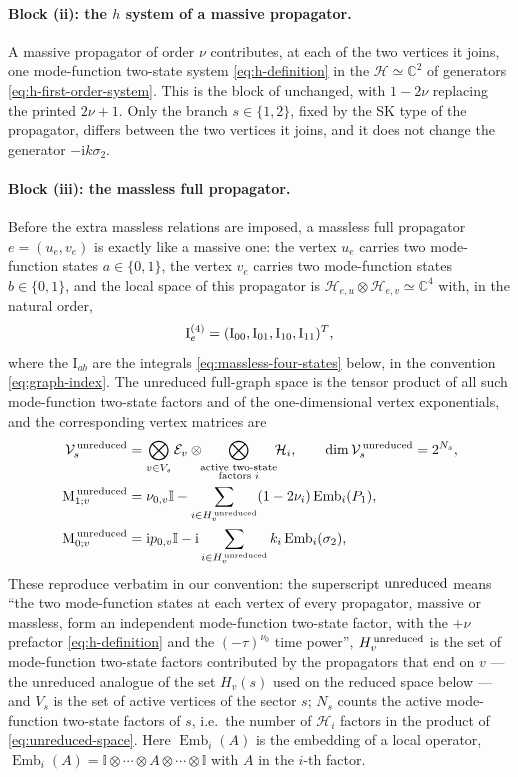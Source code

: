 \documentclass[11pt,a4paper]{article}
\newcommand{\ii}{\mathrm i}
\newcommand{\Id}{\mathbb I}
\newcommand{\cV}{\mathcal V}
\newcommand{\cE}{\mathcal E}
\newcommand{\cH}{\mathcal H}
\newcommand{\Emb}{\operatorname{Emb}}
\def\ie{\begin{equation}\begin{aligned}}
\def\fe{\end{aligned}\end{equation}}
\begin{document}
\paragraph{Block (ii): the $h$ system of a massive propagator.}
A massive propagator of order $\nu$ contributes, at each of the two vertices it joins, one mode-function two-state
system
\eqref{eq:h-definition} in the $\cH\simeq\mathbb C^2$ of generators
\eqref{eq:h-first-order-system}. This is the block of \cite{Chen:2023iix} unchanged, with $1-2\nu$
replacing the printed $2\nu+1$. Only the branch $s\in\{1,2\}$, fixed by the SK type of the
propagator, differs between the two vertices it joins, and it does not change the generator
$-\ii k\sigma_2$.

\paragraph{Block (iii): the massless full propagator.}
\label{sec:massless}
Before the extra massless relations are imposed, a massless full propagator $e=(u_e,v_e)$ is exactly
like a massive one: the vertex $u_e$ carries two mode-function states $a\in\{0,1\}$, the vertex $v_e$ carries two
mode-function states $b\in\{0,1\}$, and the local space of this propagator is
$\cH_{e,u}\otimes\cH_{e,v}\simeq\mathbb C^4$ with, in the natural order,
\begin{equation}
  \bm{\text I}_e^{(4)}=(\text{I}_{00},\text{I}_{01},\text{I}_{10},\text{I}_{11})^T ,
  \label{eq:four-state}
\end{equation}
where the $\text{I}_{ab}$ are the integrals \eqref{eq:massless-four-states} below, in the convention
\eqref{eq:graph-index}.
The unreduced full-graph space is the tensor product of all such mode-function two-state factors
and of the one-dimensional vertex exponentials, and the corresponding vertex matrices are
\ie
  \cV_s^{\,\rm unreduced}
  &=\bigotimes_{v\in V_s}\cE_v\otimes\!\!
    \bigotimes_{\substack{\text{active two-state}\\\text{factors }i}}\!\!\cH_i,
  \qquad
  \dim\cV_s^{\,\rm unreduced}=2^{N_s},
  \label{eq:unreduced-space}\\
  \text{M}_{1;v}^{\,\rm unreduced}
  &=\nu_{0,v}\Id-\sum_{i\in H_v^{\,\rm unreduced}}(1-2\nu_i)\Emb_i(P_1),\\
  \text{M}_{0;v}^{\,\rm unreduced}
  &=\ii p_{0,v}\Id-\ii\sum_{i\in H_v^{\,\rm unreduced}}k_i\Emb_i(\sigma_2),
  \fe
These reproduce \cite{Chen:2023iix} verbatim in our convention: the superscript ${\rm unreduced}$ means
``the two mode-function states at each vertex of every propagator, massive or massless, form an independent
mode-function two-state factor, with
the $+\nu$ prefactor \eqref{eq:h-definition} and the $(-\tau)^{\nu_0}$ time power'',
$H_v^{\,\rm unreduced}$ is the set of mode-function two-state factors contributed by the propagators that end on
$v$ --- the unreduced analogue of the set $H_v(s)$ used on the reduced space below --- and $V_s$ is
the set of active vertices of the sector $s$; $N_s$ counts the active mode-function two-state
factors of $s$, i.e.\ the number of $\cH_i$ factors in the product of
\eqref{eq:unreduced-space}.
Here $\Emb_i(A)$ is the embedding of a local operator,
$\Emb_i(A)=\Id\otimes\cdots\otimes A\otimes\cdots\otimes\Id$ with $A$ in the $i$-th factor.
\end{document}
